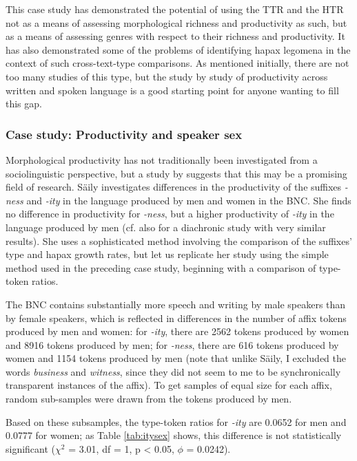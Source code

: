 This case study has demonstrated the potential of using the TTR and the HTR not as a means of assessing morphological richness and productivity as such, but as a means of assessing genres with respect to their richness and productivity. It has also demonstrated some of the problems of identifying hapax legomena in the context of such cross-text-type comparisons. As mentioned initially, there are not too many studies of this type, but the study by \citet{plag_morphological_1999} study of productivity across written and spoken language is a good starting point for anyone wanting to fill this gap.

\subsubsection{Case study: Productivity and speaker sex}
\label{sec:productivityandspeakersex}

Morphological productivity has not traditionally been investigated from a sociolinguistic perspective, but a study by \citet{saily_variation_2011} suggests that this may be a promising field of research. S\"{a}ily investigates differences in the productivity of the suffixes \textit{-ness} and \textit{-ity} in the language produced by men and women in the BNC. She finds no difference in productivity for \textit{-ness}, but a higher productivity of \textit{-ity} in the language produced by men (cf. also \citet{saily_comparing_2009} for a diachronic study with very similar results). She uses a sophisticated method involving the comparison of the suffixes' type and hapax growth rates, but let us replicate her study using the simple method used in the preceding case study, beginning with a comparison of type-token ratios.

The BNC contains substantially more speech and writing by male speakers than by female speakers, which is reflected in differences in the number of affix tokens produced by men and women: for \textit{-ity}, there are \num{2562} tokens produced by women and \num{8916} tokens produced by men; for \textit{-ness}, there are 616 tokens produced by women and \num{1154} tokens produced by men (note that unlike S\"{a}ily, I excluded the words \textit{business} and \textit{witness}, since they did not seem to me to be synchronically transparent instances of the affix). To get samples of equal size for each affix, random sub-samples were drawn from the tokens produced by men.

Based on these subsamples, the type-token ratios for \textit{-ity} are 0.0652 for men and 0.0777 for women; as Table \ref{tab:itysex} shows, this difference is not statistically significant ($\chi^2$ = 3.01, df = 1, p < 0.05, $\phi$ = 0.0242).

